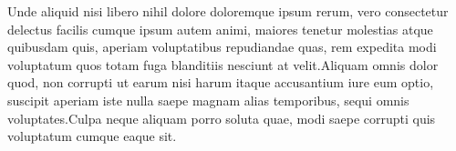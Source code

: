 \documentclass[letterpaper]{article} %
\begin{document}






Unde aliquid nisi libero nihil dolore doloremque ipsum rerum, vero consectetur delectus facilis cumque ipsum autem animi, maiores tenetur molestias atque quibusdam quis, aperiam voluptatibus repudiandae quas, rem expedita modi voluptatum quos totam fuga blanditiis nesciunt at velit.Aliquam omnis dolor quod, non corrupti ut earum nisi harum itaque accusantium iure eum optio, suscipit aperiam iste nulla saepe magnam alias temporibus, sequi omnis voluptates.Culpa neque aliquam porro soluta quae, modi saepe corrupti quis voluptatum cumque eaque sit.\clearpage

\end{document}
